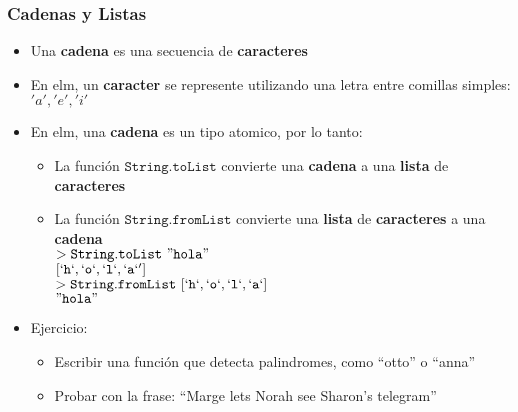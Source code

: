\documentclass{beamer}
\begin{document}
\begin{frame}
\frametitle{Cadenas y Listas}
\begin{itemize}
    \item{Una {\bf cadena} es una secuencia de {\bf caracteres}}
    \item{En elm, un {\bf caracter} se represente utilizando una letra entre comillas
    simples: $'a','e','i'$}
    \item{En elm, una {\bf cadena} es un tipo atomico, por lo tanto:
    \begin{itemize}
        \item{La funci\'on $\mathtt{String.toList}$ convierte una {\bf cadena} a una {\bf lista}
        de {\bf caracteres}}
        \item{La funci\'on $\mathtt{String.fromList}$ convierte una {\bf lista} de {\bf caracteres}
        a una {\bf cadena}\\
        $> \mathtt{String.toList}\ \mathtt{"hola"}$\\
        $[\mathtt{`h`,`o`,`l`,`a`'}]$\\
        $> \mathtt{String.fromList}\ [\mathtt{`h`,`o`,`l`,`a`}]$\\
        $\mathtt{"hola"}$}
    \end{itemize}
    }
    \item{Ejercicio:
    \begin{itemize}
        \item{Escribir una funci\'on que detecta palindromes, como ``otto'' o ``anna''}
        \item{Probar con la frase: ``Marge lets Norah see Sharon’s telegram''}
    \end{itemize}
    }
\end{itemize}
\end{frame}
\end{document}
